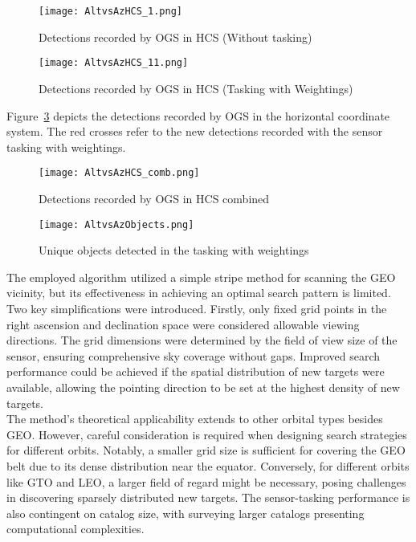 \begin{figure}[H]
	\centering
	\texttt{[image: AltvsAzHCS\_1.png]}
	\caption{Detections recorded by OGS in HCS (Without tasking)}\label{fig:}
\end{figure}


\begin{figure}[H]
	\centering
	\texttt{[image: AltvsAzHCS\_11.png]}
	\caption{Detections recorded by OGS in HCS (Tasking with Weightings)}\label{fig:}
\end{figure}

Figure~\ref{fig:AltvsAzHCS_comb} depicts the detections recorded by OGS in the horizontal coordinate system. The red crosses refer to the new detections recorded with the sensor tasking with weightings.\\


\begin{figure}[H]
	\centering
	\texttt{[image: AltvsAzHCS\_comb.png]}
	\caption{Detections recorded by OGS in HCS combined}\label{fig:AltvsAzHCS_comb}
\end{figure}


\begin{figure}[H]
	\centering
	\texttt{[image: AltvsAzObjects.png]}
	\caption{Unique objects detected in the tasking with weightings}\label{fig:AltvsAzObjects}
\end{figure}

The employed algorithm utilized a simple stripe method for scanning the GEO vicinity, but its effectiveness in achieving an optimal search pattern is limited. Two key simplifications were introduced. Firstly, only fixed grid points in the right ascension and declination space were considered allowable viewing directions. The grid dimensions were determined by the field of view size of the sensor, ensuring comprehensive sky coverage without gaps. Improved search performance could be achieved if the spatial distribution of new targets were available, allowing the pointing direction to be set at the highest density of new targets.\\

The method's theoretical applicability extends to other orbital types besides GEO. However, careful consideration is required when designing search strategies for different orbits. Notably, a smaller grid size is sufficient for covering the GEO belt due to its dense distribution near the equator. Conversely, for different orbits like GTO and LEO, a larger field of regard might be necessary, posing challenges in discovering sparsely distributed new targets. The sensor-tasking performance is also contingent on catalog size, with surveying larger catalogs presenting computational complexities.\\
